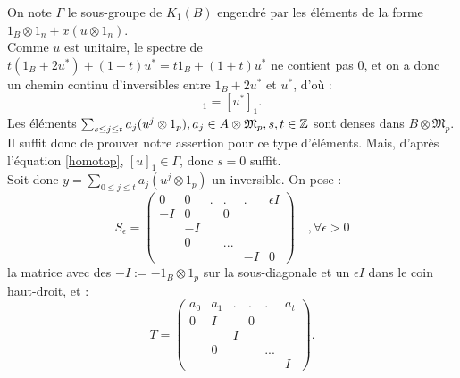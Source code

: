 \begin{dem}
On note $\Gamma$ le sous-groupe de $K_1(B)$ engendré par les éléments de la forme $1_B\otimes 1_n+x(u\otimes 1_n)$.\\

Comme $u$ est unitaire, le spectre de $t(1_B+2u^*) + (1-t)u^*=t1_B + (1+t)u^*$ ne contient pas $0$, et on a donc un chemin continu d'inversibles entre $1_B+2u^*$ et $u^*$, d'où :
\begin{equation}[1_B+2u^*]_1=[u^*]_1.\label{homotop}\end{equation}
Les éléments $\sum_{s\leq j\leq t}a_j(u^j\otimes 1_p), a_j \in A\otimes \mathfrak M_p,s,t\in \mathbb Z$ sont denses dans $B\otimes \mathfrak M_p$. Il suffit donc de prouver notre assertion pour ce type d'éléments. Mais, d'après l'équation \ref{homotop}, $[u]_1\in \Gamma$, donc $s=0$ suffit.\\

Soit donc $y=\sum_{0\leq j\leq t}a_j(u^j\otimes 1_p)$ un inversible. On pose :
\[S_\epsilon = \begin{pmatrix}0 & 0 &  .&. &. &      \epsilon I \\
				-I & 0 &  & 0 & &		    \\
				 &    -I   &   &  &  &               \\
				&      0 &    &  ... &  &        \\
				&      &     &    &-I & 0
\end{pmatrix} \quad ,\forall \epsilon >0 \]
la matrice avec des $-I:=-1_B\otimes 1_p$ sur la sous-diagonale et un $\epsilon I$ dans le coin haut-droit, et :
\[T = \begin{pmatrix}         a_0 &  a_1 &  .   &.   &.     &      a_t \\
				0 &      I &       & 0 &      &		    \\
				   &        & I     &    &      &               \\
				   &    0  &       &    & ... &        \\
				   &        &       &    &      & I
\end{pmatrix}.  \]


\end{dem}
